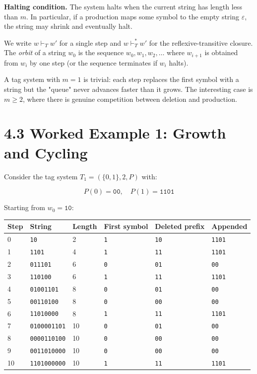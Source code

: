 \textbf{Halting condition.} The system halts when the current string has length less than $m$. In particular, if a production maps some symbol to the empty string $\varepsilon$, the string may shrink and eventually halt.

We write $w \vdash_T w'$ for a single step and $w \vdash_T^* w'$ for the reflexive-transitive closure. The \textit{orbit} of a string $w_0$ is the sequence $w_0, w_1, w_2, \ldots$ where $w_{i+1}$ is obtained from $w_i$ by one step (or the sequence terminates if $w_i$ halts).

\begin{remark}
A tag system with $m = 1$ is trivial: each step replaces the first symbol with a string but the "queue" never advances faster than it grows. The interesting case is $m \geq 2$, where there is genuine competition between deletion and production.
\end{remark}

\section{4.3 Worked Example 1: Growth and Cycling}

Consider the tag system $T_1 = (\{ 0, 1\} , 2, P)$ with:

\[
P(0) = \texttt{00}, \quad P(1) = \texttt{1101}
\]

Starting from $w_0 = \texttt{10}$:

\begin{tabular}{|l|l|l|l|l|l|}
\hline
Step & String & Length & First symbol & Deleted prefix & Appended \\
\hline
0 & \texttt{10} & 2 & \texttt{1} & \texttt{10} & \texttt{1101} \\
1 & \texttt{1101} & 4 & \texttt{1} & \texttt{11} & \texttt{1101} \\
2 & \texttt{011101} & 6 & \texttt{0} & \texttt{01} & \texttt{00} \\
3 & \texttt{110100} & 6 & \texttt{1} & \texttt{11} & \texttt{1101} \\
4 & \texttt{01001101} & 8 & \texttt{0} & \texttt{01} & \texttt{00} \\
5 & \texttt{00110100} & 8 & \texttt{0} & \texttt{00} & \texttt{00} \\
6 & \texttt{11010000} & 8 & \texttt{1} & \texttt{11} & \texttt{1101} \\
7 & \texttt{0100001101} & 10 & \texttt{0} & \texttt{01} & \texttt{00} \\
8 & \texttt{0000110100} & 10 & \texttt{0} & \texttt{00} & \texttt{00} \\
9 & \texttt{0011010000} & 10 & \texttt{0} & \texttt{00} & \texttt{00} \\
10 & \texttt{1101000000} & 10 & \texttt{1} & \texttt{11} & \texttt{1101} \\
\hline
\end{tabular}


